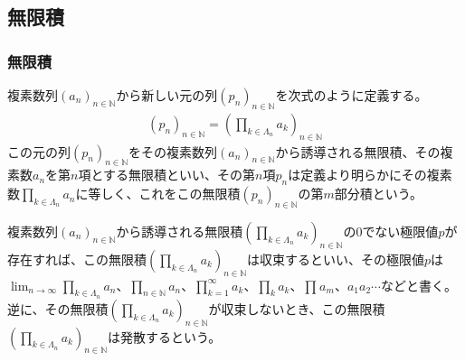 \documentclass[dvipdfmx]{jsarticle}
\begin{document}
\subsection{無限積}%
\subsubsection{無限積}%
\begin{dfn}
複素数列$\left( a_{n} \right)_{n \in \mathbb{N}}$から新しい元の列$\left( p_{n} \right)_{n \in \mathbb{N}}$を次式のように定義する。
\begin{align*}
\left( p_{n} \right)_{n \in \mathbb{N}} = \left( \prod_{k \in \varLambda_{n}} a_{k} \right)_{n \in \mathbb{N}}
\end{align*}
この元の列$\left( p_{n} \right)_{n \in \mathbb{N}}$をその複素数列$\left( a_{n} \right)_{n \in \mathbb{N}}$から誘導される無限積、その複素数$a_{n}$を第$n$項とする無限積といい、その第$n$項$p_{n}$は定義より明らかにその複素数$\prod_{k \in \varLambda_{n}} a_{n}$に等しく、これをこの無限積$\left( p_{n} \right)_{n \in \mathbb{N}}$の第$m$部分積という。
\end{dfn}
\begin{dfn}
複素数列$\left( a_{n} \right)_{n \in \mathbb{N}}$から誘導される無限積$\left( \prod_{k \in \varLambda_{n}} a_{k} \right)_{n \in \mathbb{N}}$の$0$でない極限値$p$が存在すれば、この無限積$\left( \prod_{k \in \varLambda_{n}} a_{k} \right)_{n \in \mathbb{N}}$は収束するといい、その極限値$p$は$\lim_{n \rightarrow \infty}{\prod_{k \in \varLambda_{n}} a_{n}}$、$\prod_{n \in \mathbb{N}} a_{n}$、$\prod_{k = 1}^{\infty}a_{k}$、$\prod_{k} a_{k}$、$\prod_{} a_{m}$、$a_{1}a_{2}\cdots$などと書く。逆に、その無限積$\left( \prod_{k \in \varLambda_{n}} a_{k} \right)_{n \in \mathbb{N}}$が収束しないとき、この無限積$\left( \prod_{k \in \varLambda_{n}} a_{k} \right)_{n \in \mathbb{N}}$は発散するという。
\end{dfn}
\end{document}
